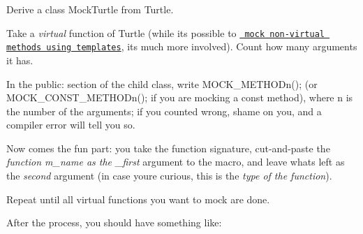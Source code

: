 \begin{DoxyEnumerate}
\item Derive a class {\ttfamily Mock\+Turtle} from {\ttfamily Turtle}.
\end{DoxyEnumerate}
\begin{DoxyEnumerate}
\item Take a {\itshape virtual} function of {\ttfamily Turtle} (while it\textquotesingle{}s possible to \href{CookBook.md\#mocking-nonvirtual-methods}{\texttt{ mock non-\/virtual methods using templates}}, it\textquotesingle{}s much more involved). Count how many arguments it has.
\end{DoxyEnumerate}
\begin{DoxyEnumerate}
\item In the {\ttfamily public\+:} section of the child class, write {\ttfamily M\+O\+C\+K\+\_\+\+M\+E\+T\+H\+O\+Dn();} (or {\ttfamily M\+O\+C\+K\+\_\+\+C\+O\+N\+S\+T\+\_\+\+M\+E\+T\+H\+O\+Dn();} if you are mocking a {\ttfamily const} method), where {\ttfamily n} is the number of the arguments; if you counted wrong, shame on you, and a compiler error will tell you so.
\end{DoxyEnumerate}
\begin{DoxyEnumerate}
\item Now comes the fun part\+: you take the function signature, cut-\/and-\/paste the {\itshape function m\+\_\+name as the \+\_\+first} argument to the macro, and leave what\textquotesingle{}s left as the {\itshape second} argument (in case you\textquotesingle{}re curious, this is the {\itshape type of the function}).
\end{DoxyEnumerate}
\begin{DoxyEnumerate}
\item Repeat until all virtual functions you want to mock are done.
\end{DoxyEnumerate}

After the process, you should have something like\+:


